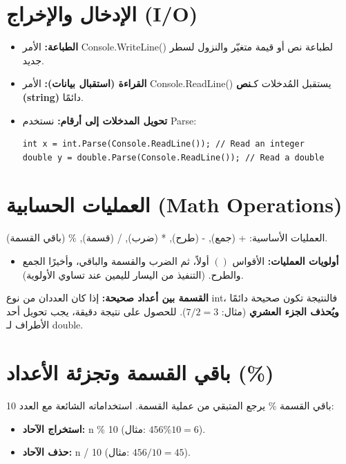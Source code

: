 \documentclass[14pt]{extarticle}
\begin{document}
\section{الإدخال والإخراج (\textenglish{I/O})}
\begin{itemize}
    \item \textbf{الطباعة:} الأمر \textenglish{Console.WriteLine()} لطباعة نص أو قيمة متغيّر والنزول لسطر جديد.
    \item \textbf{القراءة (استقبال بيانات):} الأمر \textenglish{Console.ReadLine()} يستقبل المُدخلات كـ\textbf{نص (\textenglish{string})} دائمًا.
    \item \textbf{تحويل المدخلات إلى أرقام:} نستخدم \textenglish{Parse}:
\begin{boxCode}
\begin{english}
\begin{verbatim}
int x = int.Parse(Console.ReadLine()); // Read an integer
double y = double.Parse(Console.ReadLine()); // Read a double
\end{verbatim}
\end{english}
\end{boxCode}
\end{itemize}

\section{العمليات الحسابية (\textenglish{Math Operations})}
العمليات الأساسية: \textenglish{+} (جمع), \textenglish{-} (طرح), \textenglish{*} (ضرب), \textenglish{/} (قسمة), \textenglish{\%} (باقي القسمة).
\begin{itemize}
    \item \textbf{أولويات العمليات:} الأقواس $()$ أولاً، ثم الضرب والقسمة والباقي، وأخيرًا الجمع والطرح. (التنفيذ من اليسار لليمين عند تساوي الأولوية).
\end{itemize}

\begin{boxWarning}
\textbf{القسمة بين أعداد صحيحة:} إذا كان العددان من نوع \textenglish{int}، فالنتيجة تكون صحيحة دائمًا \textbf{ويُحذف الجزء العشري} (مثال: $7 / 2 = 3$). للحصول على نتيجة دقيقة، يجب تحويل أحد الأطراف لـ \textenglish{double}.
\end{boxWarning}

\section{باقي القسمة وتجزئة الأعداد (\textenglish{\%})}
باقي القسمة \textenglish{\%} يرجع المتبقي من عملية القسمة. استخداماته الشائعة مع العدد 10:
\begin{itemize}
    \item \textbf{استخراج الآحاد:} \textenglish{n \% 10} (مثال: $456 \% 10 = 6$).
    \item \textbf{حذف الآحاد:} \textenglish{n / 10} (مثال: $456 / 10 = 45$).
\end{itemize}
\end{document}
